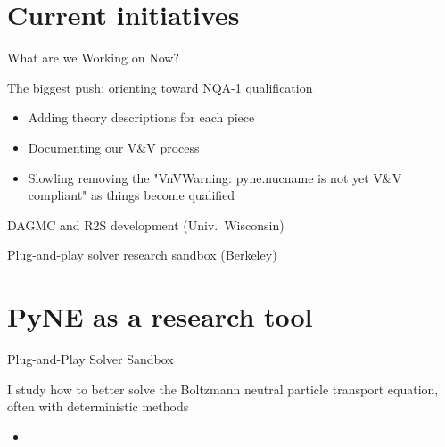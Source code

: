 \documentclass[xcolor=x11names,compress]{beamer}
\renewcommand{\(}{\begin{columns}}
\renewcommand{\)}{\end{columns}}
\newcommand{\<}[1]{\begin{column}{#1}}
\renewcommand{\>}{\end{column}}
\begin{document}
\section{Current initiatives}
\begin{frame}{What are we Working on Now?}

    The biggest push: orienting toward NQA-1 qualification \cite{pyne_vnv}
    \begin{itemize}
    \item Adding theory descriptions for each piece
    \item Documenting our V\&V process
    \item Slowling removing the "VnVWarning: pyne.nucname is not yet V\&V compliant" as
    things become qualified
    \end{itemize}

    \vspace*{1 em}
    DAGMC and R2S development (\textcolor{cardinal}{Univ.\ Wisconsin})
    
    \vspace*{1 em}
    Plug-and-play solver research sandbox (\textcolor{byellow}{Berkeley})
    
\end{frame}

\section{PyNE as a research tool}
\begin{frame}{Plug-and-Play Solver Sandbox}

    I study how to better solve the Boltzmann neutral particle transport equation, 
    often with deterministic methods
    \vspace*{1em}
    \begin{itemize}
    \item 
    \end{itemize}

\end{frame}


\end{document}
